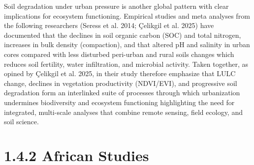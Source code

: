 Soil degradation under urban pressure is another global pattern with clear implications for ecosystem functioning. Empirical studies and meta analyses from the following researchers (Seress et al. 2014; Çelikgil et al. 2025) have documented that the declines in soil organic carbon (SOC) and total nitrogen, increases in bulk density (compaction), and that altered pH and salinity in urban cores compared with less disturbed peri-urban and rural soils changes which reduces soil fertility, water infiltration, and microbial activity. Taken together, as opined by Çelikgil et al. 2025, in their study therefore emphasize that LULC change, declines in vegetation productivity (NDVI/EVI), and progressive soil degradation form an interlinked suite of processes through which urbanization undermines biodiversity and ecosystem functioning highlighting the need for integrated, multi-scale analyses that combine remote sensing, field ecology, and soil science.
\hypertarget{african-studies}{%
\section{\texorpdfstring{\textbf{1.4.2 African Studies}}{1.4.2 African Studies}}\label{african-studies}}

